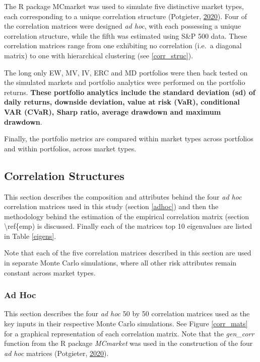 \documentclass[11pt,preprint, authoryear]{elsarticle}
\numberwithin{equation}{section}
\numberwithin{figure}{section}
\numberwithin{table}{section}
\begin{document}
The R package MCmarket was used to simulate five distinctive market
types, each corresponding to a unique correlation structure (Potgieter,
\protect\hyperlink{ref-MCmarket}{2020}). Four of the correlation
matrices were designed \emph{ad hoc}, with each possessing a unique
correlation structure, while the fifth was estimated using S\&P 500
data. These correlation matrices range from one exhibiting no
correlation (i.e.~a diagonal matrix) to one with hierarchical clustering
(see \ref{corr_struc}).

The long only EW, MV, IV, ERC and MD portfolios were then back tested on
the simulated markets and portfolio analytics were performed on the
portfolio returns. \textbf{These portfolio analytics include the
standard deviation (sd) of daily returns, downside deviation, value at
risk (VaR), conditional VAR (CVaR), Sharp ratio, average drawdown and
maximum drawdown}.

Finally, the portfolio metrics are compared within market types across
portfolios and within portfolios, across market types.

\hypertarget{correlation-structures}{%
\subsection{\texorpdfstring{Correlation Structures
\label{corr_struc}}{Correlation Structures }}\label{correlation-structures}}

This section describes the composition and attributes behind the four
\emph{ad hoc} correlation matrices used in this study (section
\ref{adhoc}) and then the methodology behind the estimation of the
empirical correlation matrix (section \textbackslash ref\{emp) is
discussed. Finally each of the matrices top 10 eigenvalues are listed in
Table \ref{eigens}.

Note that each of the five correlation matrices described in this
section are used in separate Monte Carlo simulations, where all other
risk attributes remain constant across market types.

\hypertarget{ad-hoc}{%
\subsubsection{\texorpdfstring{Ad Hoc
\label{adhoc}}{Ad Hoc }}\label{ad-hoc}}

This section describes the four \emph{ad hoc} 50 by 50 correlation
matrices used as the key inputs in their respective Monte Carlo
simulations. See Figure \ref{corr_mats} for a graphical representation
of each correlation matrix. Note that the \emph{gen\_corr} function from
the R package \emph{MCmarket} was used in the construction of the four
\emph{ad hoc} matrices (Potgieter,
\protect\hyperlink{ref-MCmarket}{2020}).
\end{document}
